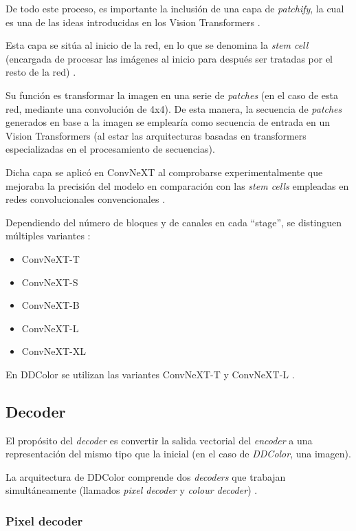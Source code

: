 \documentclass[a4paper]{article}
\begin{document}
De todo este proceso, es importante la inclusión de una capa de \textit{patchify}, la cual es una de las ideas introducidas en los Vision Transformers \cite{ConvNeXT,ViT}.

Esta capa se sitúa al inicio de la red, en lo que se denomina la \textit{stem cell} (encargada de procesar las imágenes al inicio para después ser tratadas por el resto de la red) \cite{ConvNeXT}.

Su función es transformar la imagen en una serie de \textit{patches} (en el caso de esta red, mediante una convolución de 4x4). De esta manera, la secuencia de \textit{patches} generados en base a la imagen se emplearía como secuencia de entrada en un Vision Transformers (al estar las arquitecturas basadas en transformers especializadas en el procesamiento de secuencias).

Dicha capa se aplicó en ConvNeXT al comprobarse experimentalmente que mejoraba la precisión del modelo en comparación con las \textit{stem cells} empleadas en redes convolucionales convencionales \cite{ConvNeXT}.

Dependiendo del número de bloques y de canales en cada ``stage'', se distinguen múltiples variantes \cite{ConvNeXT}:

\begin{itemize}
  \item{ConvNeXT-T}
  \item{ConvNeXT-S}
  \item{ConvNeXT-B}
  \item{ConvNeXT-L}
  \item{ConvNeXT-XL}
\end{itemize}

En DDColor se utilizan las variantes ConvNeXT-T y ConvNeXT-L \cite{DDColorRepo}.

\subsection{Decoder}

El propósito del \textit{decoder} es convertir la salida vectorial del \textit{encoder} a una representación del mismo tipo que la inicial \cite{IBMEncoderDecoder} (en el caso de \textit{DDColor}, una imagen).

La arquitectura de DDColor comprende dos \textit{decoders} que trabajan simultáneamente (llamados \textit{pixel decoder} y \textit{colour decoder}) \cite{DDColor}.

\subsubsection{Pixel decoder}
\end{document}
